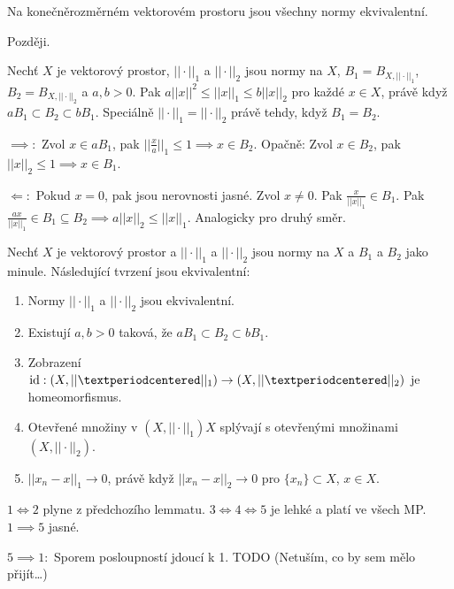 \documentclass[12pt]{article}					%
\begin{document}
\begin{veta}
	Na konečněrozměrném vektorovém prostoru jsou všechny normy ekvivalentní.

	\begin{dukazin}
		Později.
	\end{dukazin}
\end{veta}

\begin{lemma}
	Nechť $X$ je vektorový prostor, $||·||_1$ a $||·||_2$ jsou normy na $X$, $B_1 = B_{X, ||·||_1}$, $B_2 = B_{X, ||·||_2}$ a $a, b > 0$. Pak $a||x||^2 ≤ ||x||_1 ≤ b||x||_2$ pro každé $x \in X$, právě když $a B_1 \subset B_2 \subset b B_1$. Speciálně $||·||_1 = ||·||_2$ právě tehdy, když $B_1 = B_2$.

	\begin{dukazin}
		$\implies:$ Zvol $x \in a B_1$, pak $||\frac{x}{a}||_1 ≤ 1 \implies x \in B_2$. Opačně: Zvol $x \in B_2$, pak $||x||_2 ≤ 1 \implies x \in B_1$.

		$\Leftarrow:$ Pokud $x = 0$, pak jsou nerovnosti jasné. Zvol $x≠0$. Pak $\frac{x}{||x||_1} \in B_1$. Pak $\frac{ax}{||x||_1} \in B_1 \subseteq B_2 \implies a||x||_2 ≤ ||x||_1$. Analogicky pro druhý směr.  
	\end{dukazin}
\end{lemma}

\begin{tvrzeni}
	Nechť $X$ je vektorový prostor a $||·||_1$ a $||·||_2$ jsou normy na $X$ a $B_1$ a $B_2$ jako minule. Následující tvrzení jsou ekvivalentní:
	\begin{enumerate}
		\item Normy $||·||_1$ a $||·||_2$ jsou ekvivalentní.
		\item Existují $a, b > 0$ taková, že $aB_1 \subset B_2 \subset bB_1$.
		\item Zobrazení $\id: (X, ||·||_1) \rightarrow \left(X, ||·||_2\right)$ je homeomorfismus.
		\item Otevřené množiny v $\left(X, ||·||_1\right)X$ splývají s otevřenými množinami $\left(X, ||·||_2\right)$.
		\item $||x_n - x||_1 \rightarrow 0$, právě když $||x_n - x||_2 \rightarrow 0$ pro $\{x_n\} \subset X$, $x \in X$.
	\end{enumerate}

	\begin{dukazin}
		$1 \Leftrightarrow 2$ plyne z předchozího lemmatu. $3 \Leftrightarrow 4 \Leftrightarrow 5$ je lehké a platí ve všech MP. $1 \implies 5$ jasné.

		$5 \implies 1:$ Sporem posloupností jdoucí k 1. TODO (Netuším, co by sem mělo přijít…)
	\end{dukazin}
\end{tvrzeni}
\end{document}
